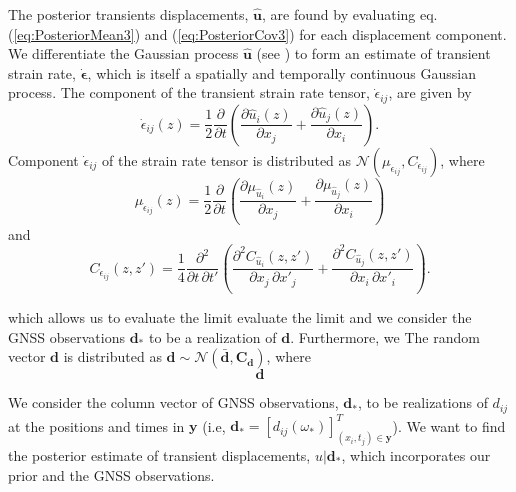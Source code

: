 \documentclass[10pt,a4paper]{article}
\begin{document}
The posterior transients displacements, $\hat{\bm{u}}$, are found by evaluating eq. (\ref{eq:PosteriorMean3}) and (\ref{eq:PosteriorCov3}) for each displacement component. We differentiate the Gaussian process $\hat{\bm{u}}$ (see \cite{Abrahamsen1997}) to form an estimate of transient strain rate, $\dot{\bm{\epsilon}}$, which is itself a spatially and temporally continuous Gaussian process. The component of the transient strain rate tensor, $\dot{\epsilon}_{ij}$, are given by
\begin{equation}\label{eq:StrainRate}
\dot{\epsilon}_{ij}(z) = \frac{1}{2} \frac{\partial}{\partial t} \left(
                                     \frac{\partial \hat{u}_i(z)}{\partial x_j} +  
                                     \frac{\partial \hat{u}_j(z)}{\partial x_i}\right).
\end{equation}
Component $\dot{\epsilon}_{ij}$ of the strain rate tensor is distributed as $\mathcal{N}(\mu_{\dot{\epsilon}_{ij}},C_{\dot{\epsilon}_{ij}})$, where
\begin{equation}\label{eq:StrainMean}
\mu_{\dot{\epsilon}_{ij}}(z) = \frac{1}{2}\frac{\partial}{\partial t}\left(
                               \frac{\partial \mu_{\hat{u}_i}(z)}{\partial x_j} + 
                               \frac{\partial \mu_{\hat{u}_j}(z)}{\partial x_i} \right)
\end{equation} 
and  
\begin{equation}\label{eq:StrainCov}
C_{\dot{\epsilon}_{ij}}(z,z') = \frac{1}{4} \frac{\partial^2}{\partial t \, \partial t'}\left(
                           \frac{\partial^2 C_{\hat{u}_i}(z,z')}{\partial x_j \, \partial x'_j} + 
                           \frac{\partial^2 C_{\hat{u}_j}(z,z')}{\partial x_i \, \partial x'_i} \right).
\end{equation} 

which allows us to evaluate the limit  evaluate the limit 
and we consider the GNSS observations $\bm{d}_*$ to be a realization of $\bm{d}$. Furthermore, we The random vector $\bm{d}$ is distributed as $\bm{d} \sim \mathcal{N}(\bar{\bm{d}},\bm{C_d})$, where 
\begin{equation}
\bm{d}
\end{equation}



We consider the column vector of GNSS observations, $\bm{d}_*$, to be realizations of $d_{ij}$ at the positions and times in $\bm{y}$ (i.e, $\bm{d}_* = [d_{ij}(\omega_*)]^T_{(x_i,t_j) \in \bm{y}}$). We want to find the posterior estimate of transient displacements, $u | \bm{d}_*$, which incorporates our prior and the GNSS observations.
\end{document}
